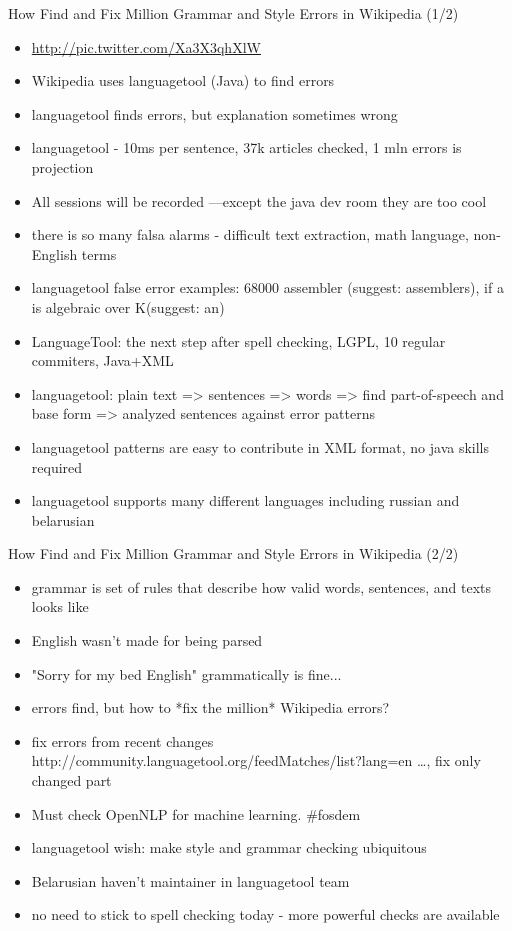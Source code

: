 \documentclass[aspectratio=169]{beamer}
\begin{document}
\begin{frame}{How Find and Fix Million Grammar and Style Errors in Wikipedia (1/2)}
  \begin{itemize}
  \item \url{http://pic.twitter.com/Xa3X3qhXlW}
  \item Wikipedia uses languagetool (Java) to find errors
  \item languagetool finds errors, but explanation sometimes wrong
  \item languagetool - 10ms per sentence, 37k articles checked, 1 mln errors is projection
  \item All sessions will be recorded ---except the java dev room they are too cool
  \item there is so many falsa alarms - difficult text extraction, math language, non-English terms
  \item languagetool false error examples: 68000 assembler (suggest: assemblers), if a is algebraic over K(suggest: an)
  \item LanguageTool: the next step after spell checking, LGPL, 10 regular commiters, Java+XML
  \item languagetool: plain text => sentences => words => find part-of-speech and base form => analyzed sentences against error patterns
  \item languagetool patterns are easy to contribute in XML format, no java skills required
  \item languagetool supports many different languages including russian and belarusian
  \end{itemize}
\end{frame}

\begin{frame}{How Find and Fix Million Grammar and Style Errors in Wikipedia (2/2)}
  \begin{itemize}
  \item grammar is set of rules that describe how valid words, sentences, and texts looks like
  \item English wasn't made for being parsed
  \item "Sorry for my bed English" grammatically is fine...
  \item errors find, but how to *fix the million* Wikipedia errors?
  \item fix errors from recent changes http://community.languagetool.org/feedMatches/list?lang=en …, fix only changed part
  \item Must check OpenNLP for machine learning. \#fosdem
  \item languagetool wish: make style and grammar checking ubiquitous
  \item Belarusian haven't maintainer in languagetool team
  \item no need to stick to spell checking today - more powerful checks are available
  \end{itemize}
\end{frame}
\end{document}
